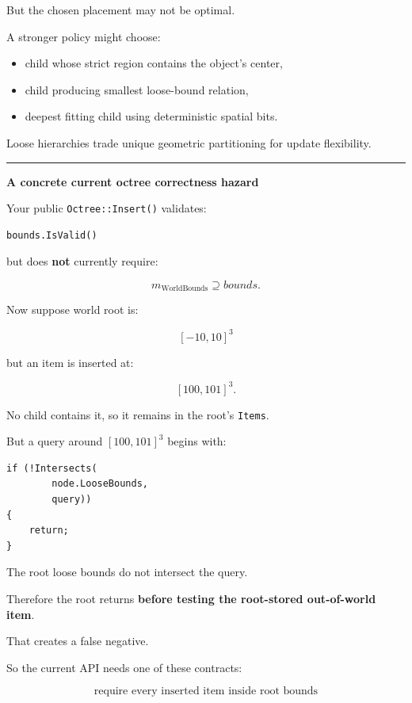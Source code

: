 But the chosen placement may not be optimal.

A stronger policy might choose:

\begin{itemize}
\tightlist
\item
  child whose strict region contains the object's center,
\item
  child producing smallest loose-bound relation,
\item
  deepest fitting child using deterministic spatial bits.
\end{itemize}

Loose hierarchies trade unique geometric partitioning for update flexibility.

\begin{center}\rule{0.5\linewidth}{0.5pt}\end{center}

\textbf{A concrete current octree correctness hazard}

Your public \texttt{Octree::Insert()} validates:

\begin{verbatim}
bounds.IsValid()
\end{verbatim}

but does \textbf{not} currently require:

\[
m_{\text{WorldBounds}}
\supseteq
bounds.
\]

Now suppose world root is:

\[
[-10,10]^3
\]

but an item is inserted at:

\[
[100,101]^3.
\]

No child contains it, so it remains in the root's \texttt{Items}.

But a query around \([100,101]^3\) begins with:

\begin{verbatim}
if (!Intersects(
        node.LooseBounds,
        query))
{
    return;
}
\end{verbatim}

The root loose bounds do not intersect the query.

Therefore the root returns \textbf{before testing the root-stored out-of-world item}.

That creates a false negative.

So the current API needs one of these contracts:

\[
\boxed{
\text{require every inserted item inside root bounds}
}
\]

